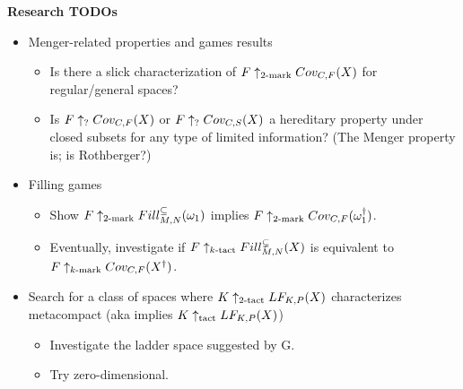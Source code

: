 


\centerline{\bf Research TODOs}

  \begin{itemize}
    \item Menger-related properties and games results
      \begin{itemize}
        \item Is there a slick characterization of $F\uparrow_{2\text{-mark}}Cov_{C,F}(X)$ for regular/general spaces?
        \item Is $F\uparrow_{?}Cov_{C,F}(X)$ or $F\uparrow_{?}Cov_{C,S}(X)$ a hereditary property under closed subsets for any type of limited information? (The Menger property is; is Rothberger?)
      \end{itemize}
    \item Filling games
      \begin{itemize}
        \item Show $F\uparrow_{2\text{-mark}}Fill^{\subseteq}_{M,N}(\omega_1)$ implies $F\uparrow_{2\text{-mark}}Cov_{C,F}(\omega_1^\dagger)$.
        \item Eventually, investigate if $F\uparrow_{k\text{-tact}}Fill^{\subsetneq}_{M,N}(X)$ is equivalent to $F\uparrow_{k\text{-mark}}Cov_{C,F}(X^\dagger)$.
      \end{itemize}
    \item Search for a class of spaces where $K\uparrow_{2\text{-tact}}LF_{K,P}(X)$ characterizes metacompact (aka implies $K\uparrow_{\text{tact}}LF_{K,P}(X)$)
      \begin{itemize}
        \item Investigate the ladder space suggested by G.
        \item Try zero-dimensional.
      \end{itemize}
  \end{itemize}
